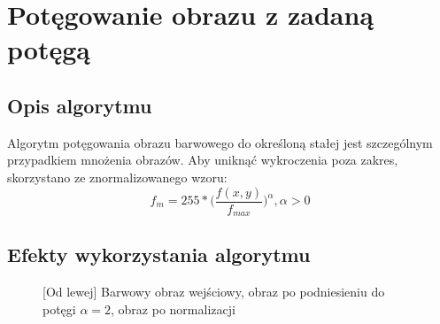 \documentclass[a4paper,12pt, titlepage]{report}
\begin{document}
\section{Potęgowanie obrazu z zadaną potęgą}
\subsection*{Opis algorytmu}
\par Algorytm potęgowania obrazu barwowego do określoną stałej jest szczególnym przypadkiem mnożenia obrazów. Aby uniknąć wykroczenia poza zakres, skorzystano ze znormalizowanego wzoru: \[f_{m}=255*\Big(\frac{f(x,y)}{f_{max}}\Big)^{\alpha},  \alpha>0\]
\subsection*{Efekty wykorzystania algorytmu}
\begin{figure}[h]
    \centering
    \caption{[Od lewej] Barwowy obraz wejściowy, obraz po podniesieniu do potęgi \(\alpha=2\), obraz po normalizacji}%
    \label{fig:rysunek}%
\end{figure}
\end{document}
